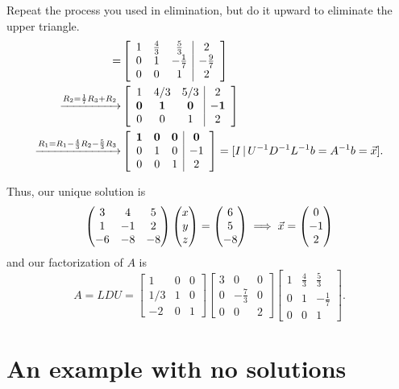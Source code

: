 \documentclass[10pt]{article}
\begin{document}
Repeat the process you used in elimination, but do it upward to eliminate the upper triangle.
\begin{align*} 
[U \, | \, D^{-1} L^{-1} b] = & \left[ \begin{array}{ccc|c}
1 & \frac{4}{3} & \frac{5}{3}  & 2 \\
0 & 1 & -\frac{1}{7}  &  -\frac{9}{7} \\ 
0 & 0 & 1 & 2
\end{array}\right] \\
\xrightarrow{R_2 = \frac{1}{7} R_3 + R_2} & \left[ \begin{array}{ccc|ccc|c}
1 & 4/3 & 5/3 & 2 \\
{\bf 0} & {\bf 1} & {\bf 0} & {\bf -1} \\ 
0 & 0 & 1 & 2
\end{array}\right] \\
\xrightarrow{R_1 = R_1 - \frac{4}{3} R_2 - \frac{5}{3} R_3} & \left[ \begin{array}{ccc|ccc|c}
{\bf 1} & {\bf 0} & {\bf 0} & {\bf 0} \\
0 & 1 & 0 & -1 \\ 
0 & 0 & 1 &  2
\end{array}\right]
 = [ I \, | \, U^{-1} D^{-1} L^{-1} b = A^{-1} b = \vec{x} ].
\end{align*}

Thus, our unique solution is 
\[ \begin{pmatrix} 3 & 4 & 5 \\ 1 & -1 & 2 \\ -6 & -8 & -8 \end{pmatrix} \begin{pmatrix} x \\ y \\ z \end{pmatrix} = \begin{pmatrix} 6 \\ 5 \\ -8 \end{pmatrix} \implies \vec{x} = \begin{pmatrix} 0 \\ -1 \\ 2 \end{pmatrix} \]
and our factorization of $A$ is 
\[ A = LDU = 
\left[ \begin{array}{ccc}
1 & 0 & 0  \\
1/3 & 1 & 0 \\ 
-2 & 0 & 1
\end{array}\right]
\left[ \begin{array}{ccc}
3 & 0 & 0 \\ 0 & -\frac{7}{3} & 0 \\ 0 & 0 & 2
\end{array}\right]
\left[ \begin{array}{ccc}
1 & \frac{4}{3} & \frac{5}{3}  \\
0 & 1 & -\frac{1}{7}  \\ 
0 & 0 & 1 
\end{array}\right]. \]


\section{An example with no solutions}
\end{document}
